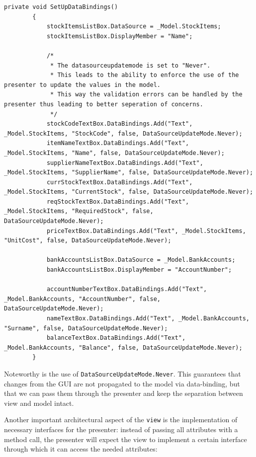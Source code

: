 \begin{lstlisting}[caption=Data Binding of \texttt{view} and \texttt{model}]
private void SetUpDataBindings()
        {
            stockItemsListBox.DataSource = _Model.StockItems;
            stockItemsListBox.DisplayMember = "Name";

            /*
             * The datasourceupdatemode is set to "Never".
             * This leads to the ability to enforce the use of the presenter to update the values in the model.
             * This way the validation errors can be handled by the presenter thus leading to better seperation of concerns.
             */
            stockCodeTextBox.DataBindings.Add("Text", _Model.StockItems, "StockCode", false, DataSourceUpdateMode.Never);
            itemNameTextBox.DataBindings.Add("Text", _Model.StockItems, "Name", false, DataSourceUpdateMode.Never);
            supplierNameTextBox.DataBindings.Add("Text", _Model.StockItems, "SupplierName", false, DataSourceUpdateMode.Never);
            currStockTextBox.DataBindings.Add("Text", _Model.StockItems, "CurrentStock", false, DataSourceUpdateMode.Never);
            reqStockTextBox.DataBindings.Add("Text", _Model.StockItems, "RequiredStock", false, DataSourceUpdateMode.Never);
            priceTextBox.DataBindings.Add("Text", _Model.StockItems, "UnitCost", false, DataSourceUpdateMode.Never);

            bankAccountsListBox.DataSource = _Model.BankAccounts;
            bankAccountsListBox.DisplayMember = "AccountNumber";

            accountNumberTextBox.DataBindings.Add("Text", _Model.BankAccounts, "AccountNumber", false, DataSourceUpdateMode.Never);
            nameTextBox.DataBindings.Add("Text", _Model.BankAccounts, "Surname", false, DataSourceUpdateMode.Never);
            balanceTextBox.DataBindings.Add("Text", _Model.BankAccounts, "Balance", false, DataSourceUpdateMode.Never);
        }
\end{lstlisting}

Noteworthy is the use of \texttt{DataSourceUpdateMode.Never}. This guarantees that changes from the \ac{GUI} are not propagated to the model via data-binding, but that we can pass them through the presenter and keep the separation between view and model intact.

Another important architectural aspect of the \texttt{view} is the implementation of necessary interfaces for the presenter: instead of passing all attributes with a method call, the presenter will expect the view to implement a certain interface through which it can access the needed attributes:

